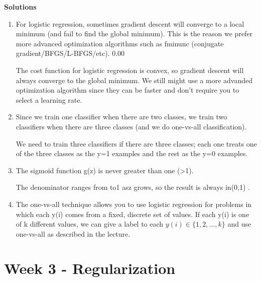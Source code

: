 \documentclass[11pt]{article} %
\begin{document}
\textbf{Solutions}
\begin{enumerate}
\item For logistic regression, sometimes gradient descent will converge to a local minimum (and fail to find the global minimum). This is the reason we prefer more advanced optimization algorithms such as fminunc (conjugate gradient/BFGS/L-BFGS/etc).  0.00

The cost function for logistic regression is convex, so gradient descent will always converge to the global minimum. We still might use a more advanded optimization algorithm since they can be faster and don't require you to select a learning rate. 

\item
Since we train one classifier when there are two classes, we train two classifiers when there are three classes (and we do one-vs-all classification).  

We need to train three classifiers if there are three classes; each one treats one of the three classes as the y=1 examples and the rest as the y=0 examples. 

\item
The sigmoid function g(z) is never greater than one (>1).   

The denominator ranges from  to1 asz grows, so the result is always in(0,1) . 
\item
The one-vs-all technique allows you to use logistic regression for problems in which each y(i) comes from a fixed, discrete set of values. 
If each y(i) is one of k different values, we can give a label to each $y(i)\in\{1,2,\ldots,k\}$ and use one-vs-all as described in the lecture. 

\end{enumerate}













	
	
	\newpage
	\section{Week 3 - Regularization }
	
\end{document}
